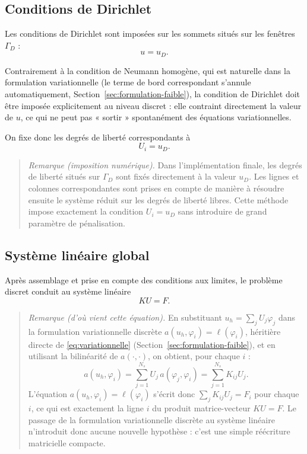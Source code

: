 \documentclass[12pt,a4paper]{article}
\begin{document}
	\subsection{Conditions de Dirichlet}
	
	Les conditions de Dirichlet sont imposées sur les sommets situés sur
	les fenêtres $\Gamma_D$ :
	\[
	u=u_D.
	\]
	
	Contrairement à la condition de Neumann homogène, qui est naturelle
	dans la formulation variationnelle (le terme de bord correspondant s'annule automatiquement, Section~\ref{sec:formulation-faible}), la condition de Dirichlet doit être
	imposée explicitement au niveau discret : elle contraint directement la valeur de $u$, ce qui ne peut pas « sortir » spontanément des équations variationnelles.
	
	On fixe donc les degrés de liberté correspondants à
	\[
	U_i=u_D.
	\]
	
	\begin{quote}
		\small\emph{Remarque (imposition numérique).} Dans l'implémentation finale, les degrés de liberté situés sur $\Gamma_D$ sont fixés directement à la valeur $u_D$. Les lignes et colonnes correspondantes sont prises en compte de manière à résoudre ensuite le système réduit sur les degrés de liberté libres. Cette méthode impose exactement la condition $U_i=u_D$ sans introduire de grand paramètre de pénalisation.
	\end{quote}
	
	\subsection{Système linéaire global}
	
	Après assemblage et prise en compte des conditions aux limites, le
	problème discret conduit au système linéaire
	\begin{equation}
		\label{eq:systeme}
		KU=F.
	\end{equation}
	
	\begin{quote}
		\small\emph{Remarque (d'où vient cette équation).} En substituant $u_h=\sum_j U_j\varphi_j$ dans la formulation variationnelle discrète $a(u_h,\varphi_i)=\ell(\varphi_i)$, héritière directe de \eqref{eq:variationnelle} (Section~\ref{sec:formulation-faible}), et en utilisant la bilinéarité de $a(\cdot,\cdot)$, on obtient, pour chaque $i$ :
		\[
		a(u_h,\varphi_i)=\sum_{j=1}^{N_s}U_j\,a(\varphi_j,\varphi_i)=\sum_{j=1}^{N_s}K_{ij}U_j.
		\]
		L'équation $a(u_h,\varphi_i)=\ell(\varphi_i)$ s'écrit donc $\sum_j K_{ij}U_j=F_i$ pour chaque $i$, ce qui est exactement la ligne $i$ du produit matrice-vecteur $KU=F$. Le passage de la formulation variationnelle discrète au système linéaire n'introduit donc aucune nouvelle hypothèse : c'est une simple réécriture matricielle compacte.
	\end{quote}
	
\end{document}
